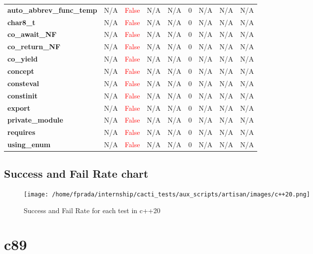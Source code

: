 \documentclass{article}
\begin{document}
\begin{xltabular}{\textwidth}{lcccccccc}
\textbf{{\fontsize{10}{12}\selectfont auto\_abbrev\_func\_temp}}& N/A&\textcolor{red}{False}& N/A&N/A& 0&N/A& N/A&N/A \\[0.5ex]
\textbf{{\fontsize{10}{12}\selectfont char8\_t}}& N/A&\textcolor{red}{False}& N/A&N/A& 0&N/A& N/A&N/A \\[0.5ex]
\textbf{{\fontsize{10}{12}\selectfont co\_await\_NF}}& N/A&\textcolor{red}{False}& N/A&N/A& 0&N/A& N/A&N/A \\[0.5ex]
\textbf{{\fontsize{10}{12}\selectfont co\_return\_NF}}& N/A&\textcolor{red}{False}& N/A&N/A& 0&N/A& N/A&N/A \\[0.5ex]
\textbf{{\fontsize{10}{12}\selectfont co\_yield}}& N/A&\textcolor{red}{False}& N/A&N/A& 0&N/A& N/A&N/A \\[0.5ex]
\textbf{{\fontsize{10}{12}\selectfont concept}}& N/A&\textcolor{red}{False}& N/A&N/A& 0&N/A& N/A&N/A \\[0.5ex]
\textbf{{\fontsize{10}{12}\selectfont consteval}}& N/A&\textcolor{red}{False}& N/A&N/A& 0&N/A& N/A&N/A \\[0.5ex]
\textbf{{\fontsize{10}{12}\selectfont constinit}}& N/A&\textcolor{red}{False}& N/A&N/A& 0&N/A& N/A&N/A \\[0.5ex]
\textbf{{\fontsize{10}{12}\selectfont export}}& N/A&\textcolor{red}{False}& N/A&N/A& 0&N/A& N/A&N/A \\[0.5ex]
\textbf{{\fontsize{10}{12}\selectfont private\_module}}& N/A&\textcolor{red}{False}& N/A&N/A& 0&N/A& N/A&N/A \\[0.5ex]
\textbf{{\fontsize{10}{12}\selectfont requires}}& N/A&\textcolor{red}{False}& N/A&N/A& 0&N/A& N/A&N/A \\[0.5ex]
\textbf{{\fontsize{10}{12}\selectfont using\_enum}}& N/A&\textcolor{red}{False}& N/A&N/A& 0&N/A& N/A&N/A \\[0.5ex]
\bottomrule
\end{xltabular}
\newpage
\subsection{Success and Fail Rate chart}
\begin{figure}[h!]
\centering
\texttt{[image: /home/fprada/internship/cacti\_tests/aux\_scripts/artisan/images/c++20.png]}
\caption{Success and Fail Rate for each test in c++20}
\label{fig:c++20}
\end{figure}
\newpage
\section{c89}
\end{document}

